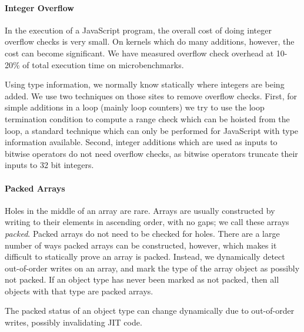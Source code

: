 \paragraph{Integer Overflow}

In the execution of a JavaScript program, the overall cost of doing integer
overflow checks is very small.
On kernels which do many additions, however, the cost can become significant.
We have measured overflow check overhead at 10-20\% of total execution
time on microbenchmarks.

Using type information, we normally know statically where integers are being
added. We use two techniques on those sites to remove overflow checks.
First, for simple additions in a loop (mainly loop counters) we try to use
the loop termination condition to compute a range
check which can be hoisted from the loop, a standard technique
which can only be performed for JavaScript with type information available.
Second, integer additions which are used as inputs to bitwise operators
do not need overflow checks, as bitwise operators truncate their inputs to 32
bit integers.

\paragraph{Packed Arrays}

Holes in the middle of an array are rare.
Arrays are usually constructed by writing to their elements in ascending
order, with no gaps; we call these arrays {\it packed}.
Packed arrays do not need to be checked for holes.
There are a large number of ways packed arrays can be constructed, however,
which makes it difficult to statically prove an array is packed.
Instead, we dynamically detect out-of-order writes on an array,
and mark the type of the array object as possibly not packed.
If an object type has never been marked as not packed, then all objects
with that type are packed arrays.


The packed status of an object type can change dynamically due to out-of-order
writes, possibly invalidating JIT code.

